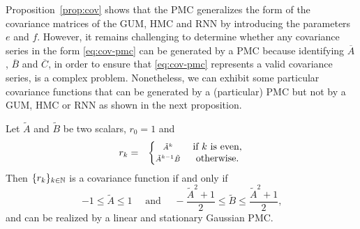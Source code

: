 Proposition~\ref{prop:cov} shows that the PMC
generalizes the form of the covariance matrices of the GUM, HMC and RNN
by introducing the parameters $e$ and $f$.
However, it remains challenging to determine whether any covariance series 
in the form \eqref{eq:cov-pmc} can be generated by a PMC
because identifying $\overline{A}$, $\overline{B}$ and $\overline{C}$, 
in order to ensure that \eqref{eq:cov-pmc} represents a 
valid covariance series, is a complex problem. 
Nonetheless, we can exhibit some particular covariance functions 
that can be generated by a (particular) PMC but not by a GUM, HMC or RNN
as shown in the next proposition.


\begin{proposition}
    \label{prop:cov-pmc}
    Let $\tilde{A}$ and $\tilde{B}$ be two scalars, $r_0 =1$ and
    \begin{eqnarray}
    \label{eq:cov-pmm-e}
    r_k&=& \left\{
    \begin{matrix}
    \scriptstyle 
    \noindent \tilde{A}^{k}  & \; \text{if } k \text{  is even,}\\ 
    \scriptstyle
    {\tilde A}^{k-1} {\tilde B} & \; \text{otherwise.}
    \end{matrix} \right. %
    \end{eqnarray}
    Then $\{r_k\}_{k \in \mathbb{N}}$ is a covariance function if and only if
    \begin{equation}
    \label{eq:cond-A-B-tilde}
    -1  \leq \tilde A \leq  1 \quad \text{ and } \quad -\frac{ \tilde A^2 +1}{2} \leq \tilde{B} \leq \frac{ \tilde A^2 +1}{2} \text{,}
    \end{equation}
    and can be realized by a linear and stationary Gaussian PMC.\\
\end{proposition}


